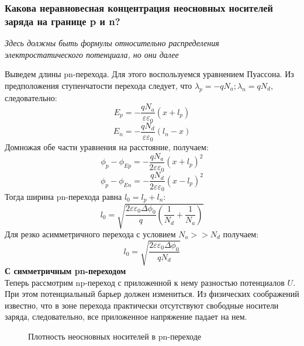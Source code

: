 \subsubsection{Какова неравновесная концентрация неосновных носителей заряда на границе p и n?}
\textit{Здесь должны быть формулы относительно распределения электростатического потенциала, но они далее}

Выведем длины pn-перехода. Для этого воспользуемся уравнением Пуассона. Из предположения ступенчатости перехода следует, что $\lambda_p = - q N_a; \lambda_n = q N_d$, следовательно:
\begin{equation}
E_p = -  \frac{q N_a}{\varepsilon \varepsilon_0} (x + l_p)
\end{equation}
\begin{equation}
E_n = -  \frac{q N_d}{\varepsilon \varepsilon_0} (l_n - x)
\end{equation}
Домножая обе части уравнения на расстояние, получаем:
\begin{equation}
\phi_p - \phi_{Ep} =  -  \frac{q N_a}{2 \varepsilon \varepsilon_0} (x + l_p)^2
\end{equation}
\begin{equation}
\phi_p - \phi_{En} =  -  \frac{q N_d}{2 \varepsilon \varepsilon_0} (x - l_p)^2
\end{equation}
Тогда ширина pn-перехода равна $l_0 = l_p + l_n$:
\begin{equation}
l_0  = \sqrt{\frac{2 \varepsilon \varepsilon_0 \Delta \phi_0}{q} (\frac{1}{N_d}+ \frac{1}{N_a})}
\end{equation}
Для резко асимметричного перехода с условием $N_a >> N_d$ получаем:
\label{sec:pn_length}
\begin{equation}
l_0  = \sqrt{\frac{2 \varepsilon \varepsilon_0 \Delta \phi_0}{q N_d} }
\end{equation}
\textbf{С симметричным pn-переходом}\\
Теперь рассмотрим np-переход с приложенной к нему разностью потенциалов $U$.
При этом потенциальный барьер должен измениться. Из физических соображений  известно, что в зоне перехода практически отсутствуют свободные носители заряда, следовательно, все приложенное напряжение падает на нем.


\begin{center}
	\begin{figure}[h!]
		\caption{Плотность неосновных носителей в pn-переходе}	
		\label{pic:pn-conc}
	\end{figure}
\end{center}


